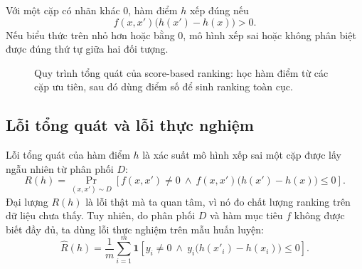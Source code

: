 Với một cặp có nhãn khác \(0\), hàm điểm \(h\) xếp đúng nếu
\begin{equation}
    f(x,x')\big(h(x')-h(x)\big)>0.
    \label{eq:section3-correct-ranking-condition}
\end{equation}
Nếu biểu thức trên nhỏ hơn hoặc bằng \(0\), mô hình xếp sai hoặc không phân biệt được đúng thứ tự giữa hai đối tượng.

\begin{figure}[H]
    \centering
    \caption{Quy trình tổng quát của score-based ranking: học hàm điểm từ các cặp ưu tiên, sau đó dùng điểm số để sinh ranking toàn cục.}
    \label{fig:section3-score-based-pipeline}
\end{figure}

\subsection{Lỗi tổng quát và lỗi thực nghiệm}

Lỗi tổng quát của hàm điểm \(h\) là xác suất mô hình xếp sai một cặp được lấy ngẫu nhiên từ phân phối \(D\):
\begin{equation}
    R(h)
    =
    \Pr_{(x,x')\sim D}
    \left[
        f(x,x')\neq 0
        \ \wedge\
        f(x,x')\big(h(x')-h(x)\big)\leq 0
    \right].
    \label{eq:section3-generalization-error}
\end{equation}
Đại lượng \(R(h)\) là lỗi thật mà ta quan tâm, vì nó đo chất lượng ranking trên dữ liệu chưa thấy. Tuy nhiên, do phân phối \(D\) và hàm mục tiêu \(f\) không được biết đầy đủ, ta dùng lỗi thực nghiệm trên mẫu huấn luyện:
\begin{equation}
    \widehat{R}(h)
    =
    \frac{1}{m}
    \sum_{i=1}^{m}
    \mathbf{1}
    \left[
        y_i\neq 0
        \ \wedge\
        y_i\big(h(x'_i)-h(x_i)\big)\leq 0
    \right].
    \label{eq:section3-empirical-error}
\end{equation}

